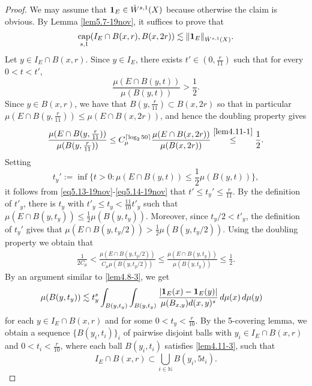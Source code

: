 \documentclass[11pt,leqno]{amsart}
\numberwithin{equation}{section}
\theoremstyle{definition}
\DeclareMathOperator{\capp}{cap}
\newcommand{\caps}{\capp_{s,1}}
\begin{document}
	\begin{proof}
		We may assume that ${\bf 1}_E\in \dot W^{s,1}(X)$ because otherwise the claim is obvious.
		By Lemma \ref{lem5.7-19nov}, it suffices to prove that
		\begin{align}\label{lem4.11-2}
			\caps(I_E\cap B(x,r),B(x,2r))\lesssim\|{\bf 1}_E\|_{\dot W^{s,1}(X)}.
		\end{align}
		Let $y\in I_E\cap B(x,r)$. Since $y\in I_E$, there exists $t'\in(0,\frac{r}{11})$
		such that for every $0<t<t'$,
		\begin{equation}\label{eq5.13-19nov}
			\frac{\mu(E\cap B(y,t))}{\mu(B(y,t))}>\frac{1}{2}.
		\end{equation}
		Since $y\in B(x,r)$, we have that $B(y,\frac{r}{11})\subset B(x,2r)$ so that
		in particular $\mu(E\cap B(y,\frac{r}{11}))\leq \mu(E\cap B(x,2r))$,
		and hence the doubling property gives 
		\begin{equation}
			\frac{\mu(E\cap B(y,\frac{r}{11}))}{\mu(B(y,\frac{r}{11}))}
			\leq C_{\mu}^{\lceil \log_2 50 \rceil} \frac{\mu(E\cap B(x,2r))}{ \mu(B(x,2r))}  \overset{\eqref{lem4.11-1}}{\leq}\frac{1}{2}.\label{eq5.14-19nov}
		\end{equation}
		Setting 
		$$
		t_y':=\inf\{t>0:\mu(E\cap B(y,t))\le\frac{1}{2}\mu(B(y,t))\},
		$$
		it follows from \eqref{eq5.13-19nov}-\eqref{eq5.14-19nov}
		that $t'\le t_y'\le\frac{r}{11}$. 
		By the definition of $t'_y$, there is $t_y$ with $t'_y\leq t_y<\tfrac{11}{10}t'_y$ such that
		$\mu(E\cap B(y,t_y))\le\frac{1}{2}\mu(B(y,t_y))$.
		Moreover, since $t_y/2<t'_y$, the definition of $t_y'$ gives that
		$\mu(E\cap B(y,t_y/2))>\frac{1}{2}\mu(B(y,t_y/2))$.
		Using the doubling property
		we obtain that
		\begin{align}
			\frac{1}{2C_{\mu}}<\frac{\mu(E\cap B(y,t_y/2))}{C_{\mu}\mu(B(y,t_y/2))} \leq \frac{\mu(E\cap B(y,t_y))}{\mu(B(y,t_y))}\leq \frac{1}{2}.
		\end{align}
		By an argument similar to \eqref{lem4.8-3}, we get
		\begin{align}\label{lem4.11-3}
			\mu(B(y,t_y))&\lesssim t_y^s\int_{B(y, t_y)}\int_{B(y, t_y)}\frac{|{\bf 1}_E(x)-{\bf 1}_E(y)|}{\mu(B_{x,y})d(x,y)^s}\,d\mu(x)\,d\mu(y)
		\end{align}
		for each $y\in I_E\cap B(x,r)$ and for some $0<t_y<\frac{r}{10}$.
		By the 5-covering lemma, we obtain a sequence $\{B(y_i, t_i)\}_i$ of pairwise disjoint balls with $y_i\in I_E\cap B(x,r)$ and $0<t_i<\frac{r}{10}$, where each ball $B(y_i,t_i)$ satisfies \eqref{lem4.11-3}, such that 
		\[
		I_E\cap B(x,r)\subset \bigcup_{i\in\mathbb N} B(y_i,5 t_i).
\]
\end{proof}
\end{document}
